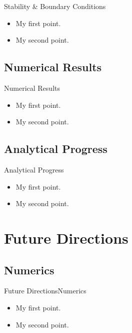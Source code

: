 \documentclass{beamer}
\begin{document}
\begin{frame}{Stability \& Boundary Conditions}
	\begin{itemize}
		\item {
			My first point.
		}
		\item {
			My second point.
		}
	\end{itemize}
\end{frame}

\subsection{Numerical Results}

\begin{frame}{Numerical Results}
	\begin{itemize}
		\item {
			My first point.
		}
		\item {
			My second point.
		}
	\end{itemize}
\end{frame}
\subsection{Analytical Progress}

\begin{frame}{Analytical Progress}
	\begin{itemize}
		\item {
			My first point.
		}
		\item {
			My second point.
		}
	\end{itemize}
\end{frame}

\section{Future Directions}

\subsection{Numerics}

\begin{frame}{Future Directions}{Numerics}
	\begin{itemize}
		\item {
			My first point.
		}
		\item {
			My second point.
		}
	\end{itemize}
\end{frame}
\end{document}
